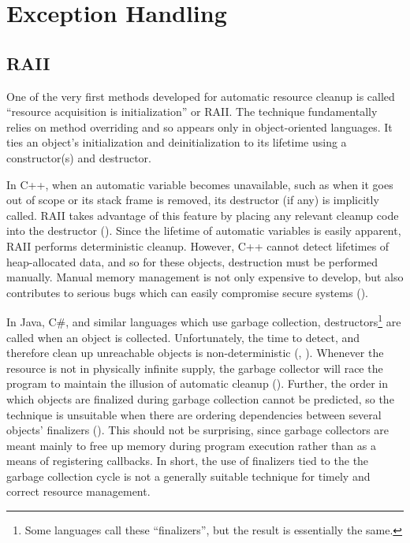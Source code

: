 \documentclass[11pt]{article}
\newcommand{\maybePage}{\newpage}
\begin{document}
\maybePage
\section{Exception Handling}

\subsection{RAII}
\label{RAII}

One of the very first methods developed for automatic resource cleanup is called ``resource acquisition is initialization'' or RAII.
The technique fundamentally relies on method overriding and so appears only in object-oriented languages.
It ties an object's initialization and deinitialization to its lifetime using a constructor(s) and destructor.

In C++, when an automatic variable becomes unavailable, such as when it goes out of scope or its stack frame is removed, its destructor (if any) is implicitly called.
RAII takes advantage of this feature by placing any relevant cleanup code into the destructor (\cite{cplusplusLanguage}).
Since the lifetime of automatic variables is easily apparent, RAII performs deterministic cleanup.
However, C++ cannot detect lifetimes of heap-allocated data, and so for these objects, destruction must be performed manually.
Manual memory management is not only expensive to develop, but also contributes to serious bugs which can easily compromise secure systems (\cite{WeimerNecula08}).


In Java, C\#, and similar languages which use garbage collection, destructors\footnote{Some languages call these ``finalizers'', but the result is essentially the same.} are called when an object is collected.
Unfortunately, the time to detect, and therefore clean up unreachable objects is non-deterministic (\cite{JavaStandard}, \cite{cSharpStandard}).
Whenever the resource is not in physically infinite supply, the garbage collector will race the program to maintain the illusion of automatic cleanup (\cite{WeimerNecula08}).
Further, the order in which objects are finalized during garbage collection cannot be predicted, so the technique is unsuitable when there are ordering dependencies between several objects' finalizers (\cite{WeimerNecula08}).
This should not be surprising, since garbage collectors are meant mainly to free up memory during program execution rather than as a means of registering callbacks.
In short, the use of finalizers tied to the the garbage collection cycle is not a generally suitable technique for timely and correct resource management.
\end{document}
